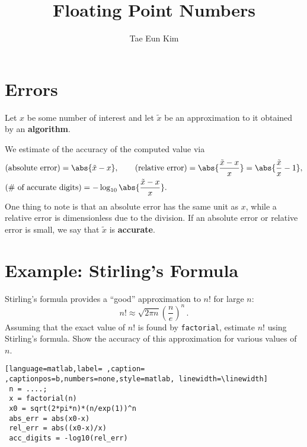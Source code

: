 \documentclass[]{ximera}
\author{Tae Eun Kim}
\date{}
\title{Floating Point Numbers}
\begin{document}
\maketitle
\section{Errors}
\label{sec:orgf6508a2}
Let $x$ be some number of interest and let $\tilde{x}$ be an approximation to it obtained by an \textbf{algorithm}.

We estimate of the accuracy of the computed value via
\begin{align*}
  &\text{(absolute error)}
    = \abs{\tilde{x}-x}, \qquad
  \text{(relative error)}
    = \abs{\frac{\tilde{x}-x}{x}}
    = \abs{\frac{\tilde{x}}{x} - 1}, \\
  &\text{(\# of accurate digits)}
    = -\log_{10} \abs{\frac{\tilde{x}-x}{x}}.
\end{align*}
One thing to note is that an absolute error has the same unit as $x$, while a relative error is dimensionless due to the division. If an absolute error or relative error is small, we say that $\tilde{x}$ is \textbf{accurate}.

\section{Example: Stirling's Formula}
\label{sec:orgd802b31}
Stirling's formula provides a ``good'' approximation to $n!$ for large $n$:
\begin{equation}
  \label{eq:stirling}
  n! \approx \sqrt{2 \pi n} {\left( \frac{n}{e} \right)}^n \,.
  \tag{$\star$}
\end{equation}
Assuming that the exact value of $n!$ is found by \texttt{factorial}, estimate $n!$ using Stirling's formula. Show the accuracy of this approximation for various values of $n$.

\begin{lstlisting}[language=matlab,label= ,caption= ,captionpos=b,numbers=none,style=matlab, linewidth=\linewidth]
 n = ....;
 x = factorial(n)
 x0 = sqrt(2*pi*n)*(n/exp(1))^n
 abs_err = abs(x0-x)
 rel_err = abs((x0-x)/x)
 acc_digits = -log10(rel_err)
\end{lstlisting}
\vs
\end{document}
